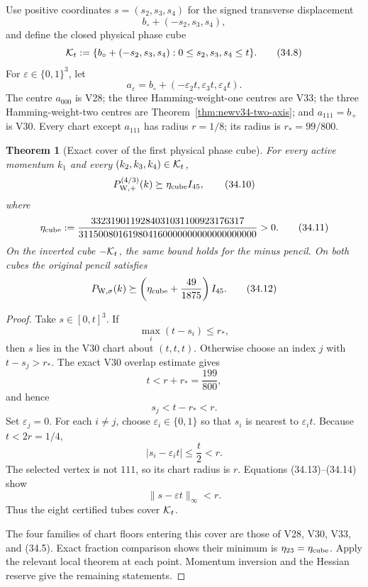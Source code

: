 \documentclass[11pt,oneside]{article}
\newtheorem{theorem}{Theorem}[section]
\theoremstyle{definition}
\theoremstyle{remark}
\begin{document}
Use positive coordinates \(s=(s_2,s_3,s_4)\) for the signed
transverse displacement
\[
 b_\circ+(-s_2,s_3,s_4),
\]
and define the closed physical phase cube
\[
 {\cal K}_t:=
 \{b_\circ+(-s_2,s_3,s_4):0\le s_2,s_3,s_4\le t\}.
                                                               \tag{34.8}
\]
For \(\varepsilon\in\{0,1\}^3\), let
\[
 a_\varepsilon
 =b_\circ+(-\varepsilon_2t,\varepsilon_3t,\varepsilon_4t).
                                                               \tag{34.9}
\]
The centre \(a_{000}\) is V28; the three Hamming-weight-one
centres are V33; the three Hamming-weight-two centres are
Theorem~\ref{thm:newv34-two-axis}; and \(a_{111}=b_+\) is V30.
Every chart except \(a_{111}\) has radius \(r=1/8\); its radius is
\(r_*=99/800\).

\begin{theorem}[Exact cover of the first physical phase cube]
\label{thm:newv34-cube-cover}
For every active momentum \(k_1\) and every
\((k_2,k_3,k_4)\in{\cal K}_t\),
\[
 P_{\mathrm W,+}^{(4/3)}(k)\succeq
 \eta_{\rm cube} I_{45},                               \tag{34.10}
\]
where
\[
 \eta_{\rm cube}:=
\frac{3323190119284031031100923176317}
{311500801619804160000000000000000000}>0.              \tag{34.11}
\]
On the inverted cube \(-{\cal K}_t\), the same bound holds for the
minus pencil.  On both cubes the original pencil satisfies
\[
 P_{\mathrm W,\sigma}(k)\succeq
 \left(\eta_{\rm cube}+\frac{49}{1875}\right)I_{45}.    \tag{34.12}
\]
\end{theorem}

\begin{proof}
Take \(s\in[0,t]^3\).  If
\[
 \max_i(t-s_i)\le r_*,
\]
then \(s\) lies in the V30 chart about \((t,t,t)\).
Otherwise choose an index \(j\) with \(t-s_j>r_*\).  The exact V30
overlap estimate gives
\[
 t<r+r_*=\frac{199}{800},
\]
and hence
\[
 s_j<t-r_*<r.                                          \tag{34.13}
\]
Set \(\varepsilon_j=0\).  For each \(i\ne j\), choose
\(\varepsilon_i\in\{0,1\}\) so that \(s_i\) is nearest to
\(\varepsilon_it\).  Because \(t<2r=1/4\),
\[
 |s_i-\varepsilon_it|\le\frac t2<r.                    \tag{34.14}
\]
The selected vertex is not \(111\), so its chart radius is \(r\).
Equations (34.13)--(34.14) show
\[
 \|s-\varepsilon t\|_\infty<r.
\]
Thus the eight certified tubes cover \({\cal K}_t\).

The four families of chart floors entering this cover are those of
V28, V30, V33, and (34.5).  Exact fraction comparison shows their
minimum is \(\eta_{23}=\eta_{\rm cube}\).  Apply the relevant local
theorem at each point.  Momentum inversion and the Hessian reserve
give the remaining statements.
\end{proof}
\end{document}
